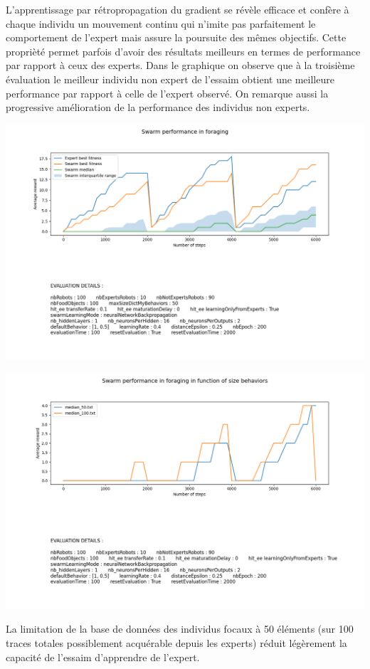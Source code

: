 \documentclass[a4paper, 12pt]{report}
\begin{document}
    L'apprentissage par rétropropagation du gradient se révèle efficace et confère à chaque individu un mouvement continu qui n'imite pas parfaitement le comportement de l'expert mais assure la poursuite des mêmes objectifs. Cette proprièté permet parfois d'avoir des résultats meilleurs en termes de performance par rapport à ceux des experts. 
    Dans le graphique on observe que à la troisième évaluation le meilleur individu non expert de l'essaim obtient une meilleure performance par rapport à celle de l'expert observé. On remarque aussi la progressive amélioration de la performance des individus non experts.


    \includegraphics[scale=0.5]{bp6000_50.png}

    \includegraphics[scale=0.5]{sizeDB_50vs100_bp.png}

    La limitation de la base de données des individus focaux à 50 éléments (sur 100 traces totales possiblement acquérable depuis les experts) réduit légèrement la capacité de l'essaim d'apprendre de l'expert. 
\end{document}
